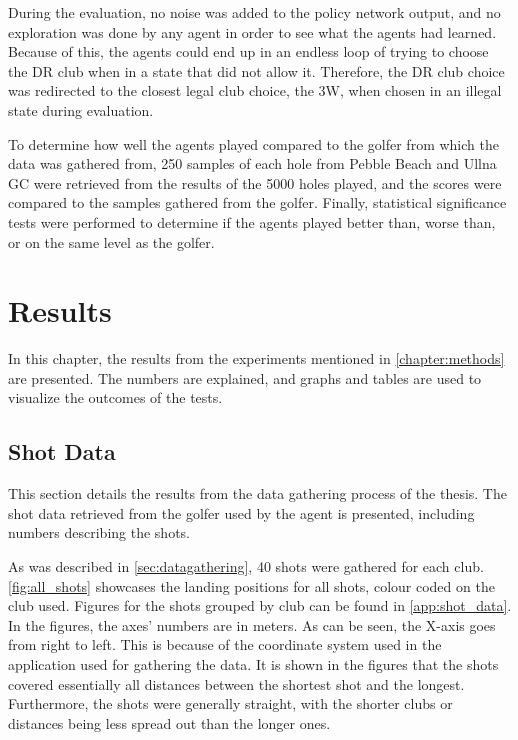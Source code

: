 \documentclass{kththesis}
\begin{document}
During the evaluation, no noise was added to the policy network output, and no exploration was done by any agent in order to see what the agents had learned. Because of this, the agents could end up in an endless loop of trying to choose the DR club when in a state that did not allow it. Therefore, the DR club choice was redirected to the closest legal club choice, the 3W, when chosen in an illegal state during evaluation.

To determine how well the agents played compared to the golfer from which the data was gathered from, 250 samples of each hole from Pebble Beach and Ullna GC were retrieved from the results of the 5000 holes played, and the scores were compared to the samples gathered from the golfer. Finally, statistical significance tests were performed to determine if the agents played better than, worse than, or on the same level as the golfer.

\chapter{Results}
\label{chapter:results}
In this chapter, the results from the experiments mentioned in \autoref{chapter:methods} are presented. The numbers are explained, and graphs and tables are used to visualize the outcomes of the tests.

\section{Shot Data}
This section details the results from the data gathering process of the thesis. The shot data retrieved from the golfer used by the agent is presented, including numbers describing the shots.

As was described in \autoref{sec:datagathering}, 40 shots were gathered for each club. \autoref{fig:all_shots} showcases the landing positions for all shots, colour coded on the club used. Figures for the shots grouped by club can be found in \autoref{app:shot_data}. In the figures, the axes' numbers are in meters. As can be seen, the X-axis goes from right to left. This is because of the coordinate system used in the application used for gathering the data. It is shown in the figures that the shots covered essentially all distances between the shortest shot and the longest. Furthermore, the shots were generally straight, with the shorter clubs or distances being less spread out than the longer ones.
\end{document}
